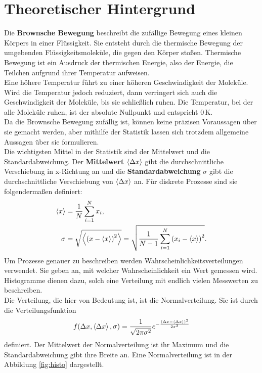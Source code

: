 \section*{Theoretischer Hintergrund}

Die \textbf{Brownsche Bewegung} beschreibt die zufällige Bewegung eines kleinen Körpers in einer Flüssigkeit. Sie entsteht durch die thermische Bewegung der umgebenden Flüssigkeitsmoleküle, die gegen den Körper stoßen.
Thermische Bewegung ist ein Ausdruck der thermischen Energie, also der Energie, die Teilchen aufgrund ihrer Temperatur aufweisen.\\
Eine höhere Temperatur führt zu einer höheren Geschwindigkeit der Moleküle. Wird die Temperatur jedoch reduziert, dann verringert sich auch die Geschwindigkeit der Moleküle, bis sie schließlich ruhen. Die Temperatur, bei der alle Moleküle ruhen, ist der absolute Nullpunkt und entspricht $0 \,$K.\\

Da die Brownsche Bewegung zufällig ist, können keine präzisen Voraussagen über sie gemacht werden, aber mithilfe der Statistik lassen sich trotzdem allgemeine Aussagen über sie formulieren.\\
Die wichtigsten Mittel in der Statistik sind der Mittelwert und die Standardabweichung. Der \textbf{Mittelwert} $\left< \Delta x \right>$ gibt die durchschnittliche Verschiebung in x-Richtung an und die \textbf{Standardabweichung} $\sigma$ gibt die durchschnittliche Verschiebung von $\left< \Delta x \right>$ an. Für diskrete Prozesse sind sie folgendermaßen definiert:
\begin{align}
  \left< x \right> & = \frac{1}{N} \sum_{i=1}^{N} x_i, \\
  \sigma & = \sqrt{\left<  {\left( x - \left< x \right> \right)}^2  \right>} = \sqrt{\frac{1}{N - 1} \sum_{i=1}^{N} {\left( x_i - \left< x \right> \right)}^2}.
\end{align}
Um Prozesse genauer zu beschreiben werden Wahrscheinlichkeitsverteilungen verwendet. Sie geben an, mit welcher Wahrscheinlichkeit ein Wert gemessen wird. Histogramme dienen dazu, solch eine Verteilung mit endlich vielen Messwerten zu beschreiben.\\
Die Verteilung, die hier von Bedeutung ist, ist die Normalverteilung. Sie ist durch die Verteilungsfunktion
\begin{equation}
  f(\Delta x, \left< \Delta x \right>, \sigma) = \frac{1}{\sqrt{2 \pi \sigma^2}} e^{- \frac{(\Delta x - \left< \Delta x \right>)^2}{2 \sigma^2}} \label{eq:gauss}
\end{equation}
definiert. Der Mittelwert der Normalverteilung ist ihr Maximum und die Standardabweichung gibt ihre Breite an. Eine Normalverteilung ist in der Abbildung \ref{fig:histo} dargestellt.\\

